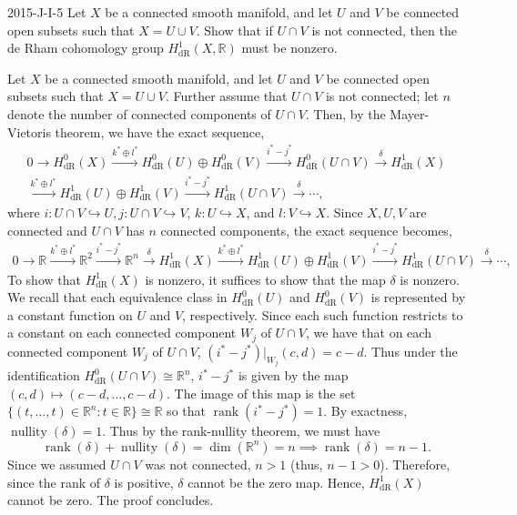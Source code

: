 \documentclass{article}
\newcommand{\embedd}{\hookrightarrow}
\begin{document}
	
	\begin{prb}{2015-J-I-5}
		Let $X$ be a connected smooth manifold, and let $U$ and $V$ be connected open subsets such that $X = U \cup V$. Show that if $U \cap V$ is not connected, then the de Rham cohomology group $H^{1}_{\text{dR}}(X, \mathbb{R})$ must be nonzero. 
	\end{prb}
	Let $X$ be a connected smooth manifold, and let $U$ and $V$ be connected open subsets such that $X = U \cup V$. Further assume that $U \cap V$ is not connected; let $n$ denote the number of connected components of $U \cap V$. Then, by the Mayer-Vietoris theorem, we have the exact sequence, 
	\begin{multline*}
		0 \to H^{0}_{\text{dR}}(X) \xrightarrow{k^{\ast} \oplus l^{\ast}} H^{0}_{\text{dR}}(U) \oplus H^{0}_{\text{dR}}(V) \xrightarrow{i^{\ast} - j^{\ast}} H^{0}_{\text{dR}}(U \cap V) \xrightarrow{\delta} H^{1}_{\text{dR}}(X) \\\xrightarrow{k^{\ast} \oplus l^{\ast}} H^{1}_{\text{dR}}(U) \oplus H^{1}_{\text{dR}}(V) \xrightarrow{i^{\ast} - j^{\ast}}H^{1}_{\text{dR}}(U \cap V) \xrightarrow{\delta} \dotsm, 
	\end{multline*}
	where $i: U \cap V \embedd U, j: U \cap V \embedd V$, $k: U \embedd X$, and $l: V \embedd X$. Since $X, U, V$ are connected and $U \cap V$ has $n$ connected components, the exact sequence becomes, 
	\begin{multline*}
		0 \to \mathbb{R} \xrightarrow{k^{\ast} \oplus l^{\ast}} \mathbb{R}^{2} \xrightarrow{i^{\ast} - j^{\ast}} \mathbb{R}^{n} \xrightarrow{\delta} H^{1}_{\text{dR}}(X) \xrightarrow{k^{\ast} \oplus l^{\ast}} H^{1}_{\text{dR}}(U) \oplus H^{1}_{\text{dR}}(V) \xrightarrow{i^{\ast} - j^{\ast}}H^{1}_{\text{dR}}(U \cap V) \xrightarrow{\delta} \dotsm, 
	\end{multline*}
	To show that $H^{1}_{\text{dR}}(X)$ is nonzero, it suffices to show that the map $\delta$ is nonzero. We recall that each equivalence class in $H^{0}_{\text{dR}}(U)$ and $H^{0}_{\text{dR}}(V)$ is represented by a constant function on $U$ and $V$, respectively. Since each such function restricts to a constant on each connected component $W_{j}$ of $U \cap V$, we have that on each connected component $W_{j}$ of $U \cap V$, $(i^{\ast} - j^{\ast})|_{W_{j}}(c, d) = c - d$. Thus under the identification $H^{0}_{\text{dR}}(U \cap V) \cong \mathbb{R}^{n}$, $i^{\ast} - j^{\ast}$ is given by the map $(c, d) \mapsto (c - d, \ldots, c - d)$. The image of this map is the set $\{(t, \ldots, t) \in \mathbb{R}^{n}: t \in\mathbb{R}\} \cong \mathbb{R}$ so that $\operatorname{rank}(i^{\ast} - j^{\ast}) = 1$. By exactness, $\operatorname{nullity}(\delta) = 1$. Thus by the rank-nullity theorem, we must have 
	\begin{equation*}
		\operatorname{rank}(\delta) + \operatorname{nullity}(\delta) = \dim(\mathbb{R}^{n}) = n  \implies \operatorname{rank}(\delta) = n - 1. 
	\end{equation*}
	Since we assumed $U \cap V$ was not connected, $n > 1$ (thus, $n - 1 > 0$). Therefore, since the rank of $\delta$ is positive, $\delta$ cannot be the zero map. Hence, $H^{1}_{\text{dR}}(X)$ cannot be zero. The proof concludes. 
	
\end{document}
